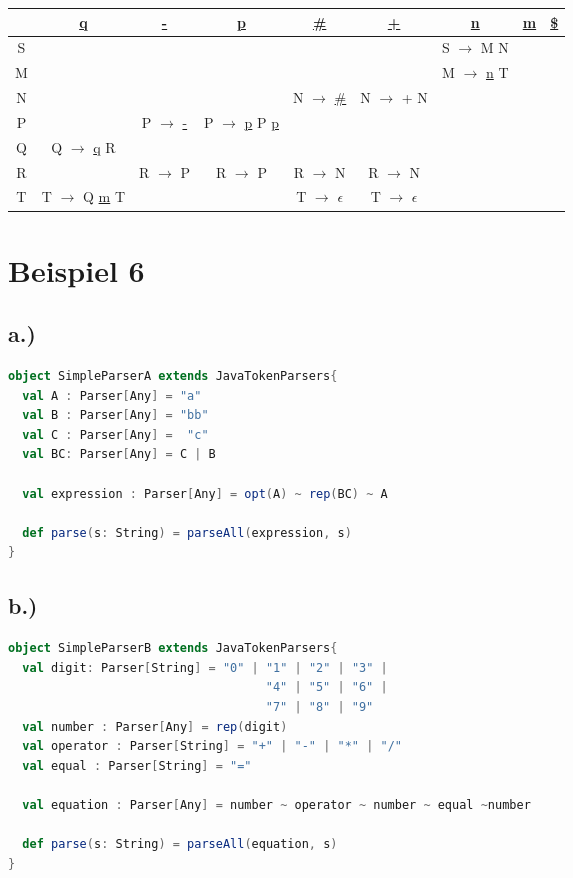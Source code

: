 \documentclass[12pt,runningheads,a4paper]{llncs}
\begin{document}
\begin{table}[htbp]
    \centering
      \begin{tabular}{|c|c|c|c|c|c|c|m{1cm}|m{1cm}|}
\hline
    & \underline{q} & \underline{-} & \underline{p} & \underline{\#} & \underline{+} & \underline{n} & \underline{m}& \underline{\$}\\ \hline
S &   &   &   &   &   & S $\rightarrow$ M N & & \\ \hline
M &   &   &   &   &   & M $\rightarrow$ \underline{n} T &  &\\ \hline
N &   &   &   & N $\rightarrow$ \underline{\#} & N $\rightarrow$ + N &   & & \\ \hline
P &   & P $\rightarrow$ \underline{-} & P $\rightarrow$ \underline{p} P \underline{p} &   &   &  & &\\ \hline
Q & Q $\rightarrow$ \underline{q} R &   &   &   &   &   &  &\\ \hline
R &   & R $\rightarrow$ P & R $\rightarrow$ P & R $\rightarrow$ N & R $\rightarrow$ N &   & &\\ \hline
T & T $\rightarrow$ Q \underline{m} T &   &   & T $\rightarrow$ $\epsilon$ & T $\rightarrow$ $\epsilon$ & & &\\ 
\hline
        \end{tabular}
\end{table}

\newpage

\section*{Beispiel 6}
\subsection*{a.)}
\begin{lstlisting}[language=scala]
object SimpleParserA extends JavaTokenParsers{
  val A : Parser[Any] = "a"
  val B : Parser[Any] = "bb"
  val C : Parser[Any] =  "c"
  val BC: Parser[Any] = C | B

  val expression : Parser[Any] = opt(A) ~ rep(BC) ~ A

  def parse(s: String) = parseAll(expression, s)
}
\end{lstlisting}

\subsection*{b.)}

\begin{lstlisting}[language=scala]
object SimpleParserB extends JavaTokenParsers{
  val digit: Parser[String] = "0" | "1" | "2" | "3" |
                                    "4" | "5" | "6" |
                                    "7" | "8" | "9"
  val number : Parser[Any] = rep(digit)
  val operator : Parser[String] = "+" | "-" | "*" | "/"
  val equal : Parser[String] = "="
  
  val equation : Parser[Any] = number ~ operator ~ number ~ equal ~number
  
  def parse(s: String) = parseAll(equation, s)
}
\end{lstlisting}
\end{document}
